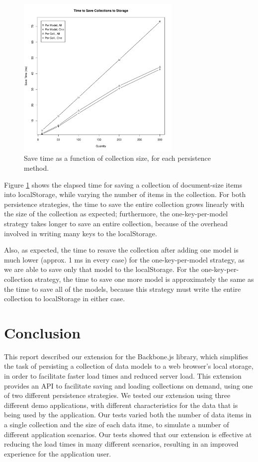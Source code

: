 \documentclass[12pt]{article}
\begin{document}
\begin{figure}[th]
    \centering
    \includegraphics[width=0.7\textwidth]{save.pdf}
    \caption{Save time as a function of collection size, for each persistence
    method.}
    \label{fig:save}
\end{figure}

Figure \ref{fig:save} shows the elapsed time for saving a collection of
document-size items into localStorage, while varying the number of items in the
collection. For both persistence strategies, the time to save the entire
collection grows linearly with the size of the collection as expected;
furthermore, the one-key-per-model strategy takes longer to save an entire
collection, because of the overhead involved in writing many keys to the
localStorage.

Also, as expected, the time to resave the collection after adding one model is
much lower (approx. 1 ms in every case) for the one-key-per-model strategy, as
we are able to save only that model to the localStorage. For the
one-key-per-collection strategy, the time to save one more model is
approximately the same as the time to save all of the models, because this
strategy must write the entire collection to localStorage in either case.

\section{Conclusion}

This report described our extension for the Backbone.js library, which
simplifies the task of persisting a collection of data models to a web
browser's local storage, in order to facilitate faster load times and reduced
server load. This extension provides an API to facilitate saving and loading
collections on demand, using one of two different persistence strategies. We
tested our extension using three different demo applications, with different
characteristics for the data that is being used by the application. Our tests
varied both the number of data items in a single collection and the size of
each data itme, to simulate a number of different application scenarios. Our
tests showed that our extension is effective at reducing the load times in many
different scenarios, resulting in an improved experience for the application
user.



\end{document}
